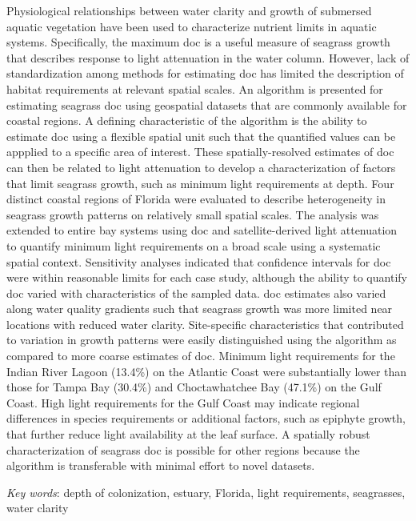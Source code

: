 \documentclass[letterpaper,12pt,oneside]{article}\usepackage[]{graphicx}\usepackage[]{color}
\begin{document}
Physiological relationships between water clarity and growth of submersed aquatic vegetation have been used to  characterize nutrient limits in aquatic systems.  Specifically, the maximum \ac{doc} is a useful measure of seagrass growth that describes response to light attenuation in the water column.  However, lack of standardization among methods for estimating \ac{doc} has limited the description of habitat requirements at relevant spatial scales.  An algorithm is presented for estimating seagrass \ac{doc} using geospatial datasets that are commonly available for coastal regions.  A defining characteristic of the algorithm is the ability to estimate \ac{doc} using a flexible spatial unit such that the quantified values can be appplied to a specific area of interest.  These spatially-resolved estimates of \ac{doc} can then be related to light attenuation to develop a characterization of factors that limit seagrass growth, such as minimum light requirements at depth.  Four distinct coastal regions of Florida were evaluated to describe heterogeneity in seagrass growth patterns on relatively small spatial scales.  The analysis was extended to entire bay systems using \ac{doc} and satellite-derived light attenuation to quantify minimum light requirements on a broad scale using a systematic spatial context.  Sensitivity analyses indicated that confidence intervals for \ac{doc} were within reasonable limits for each case study, although the ability to quantify \ac{doc} varied with characteristics of the sampled data.  \ac{doc} estimates also varied along water quality gradients such that seagrass growth was more limited near locations with reduced water clarity. Site-specific characteristics that contributed to variation in growth patterns were easily distinguished using the algorithm as compared to more coarse estimates of \ac{doc}.  Minimum light requirements for the Indian River Lagoon (13.4\%) on the Atlantic Coast were substantially lower than those for Tampa Bay (30.4\%) and Choctawhatchee Bay (47.1\%) on the Gulf Coast.  High light requirements for the Gulf Coast may indicate regional differences in species requirements or additional factors, such as epiphyte growth, that further reduce light availability at the leaf surface.  A spatially robust characterization of seagrass \ac{doc} is possible for other regions because the algorithm is transferable with minimal effort to novel datasets.

\noindent \textit{Key words}: depth of colonization, estuary, Florida, light requirements, seagrasses, water clarity
\end{document}
